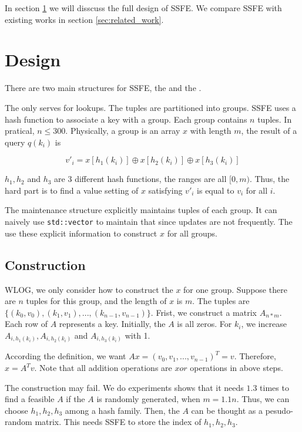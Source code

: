 \documentclass{article}
\begin{document}

In section \ref{sec:design} we will disscuss the full design of SSFE. We compare SSFE with existing works in section \ref{sec:related_work}.

\section{Design}
\label{sec:design}

There are two main structures for SSFE, the \qs and the \ms.

\textbf{\qs} The \qs only serves for lookups. The tuples are partitioned into groups. SSFE uses a hash function to associate a key with a group. Each group contains $n$ tuples. In pratical, $n \le 300$. Physically, a group is an array $x$ with length $m$, the result of a query $q(k_i)$ is

$$v'_i = x[h_1(k_i)] \oplus x[h_2(k_i)] \oplus x[h_3(k_i)]$$

$h_1, h_2$ and $h_3$ are 3 different hash functions, the ranges are all $[0, m)$. Thus, the hard part is to find a value setting of $x$ satisfying $v'_i$ is equal to $v_i$ for all $i$.


\textbf{\ms} The maintenance structure explicitly maintains tuples of each group. It can naively use \texttt{std::vector} to maintain that since updates are not frequently. The \ms use these explicit information to construct $x$ for all groups.


\subsection{Construction}
\label{sec:construction}

WLOG, we only consider how to construct the $x$ for one group. Suppose there are $n$ tuples for this group, and the length of $x$ is $m$. The tuples are $\{(k_0, v_0), (k_1, v_1), ..., (k_{n-1}, v_{n-1})\}$. Frist, we construct a matrix $A_{n*m}$. Each row of $A$ represents a key. Initially, the $A$ is all zeros. For $k_i$, we increase $A_{i,h_1(k_i)}, A_{i,h_2(k_i)}$ and $A_{i,h_3(k_i)}$ with 1.

According the definition, we want $Ax = (v_0, v_1, ..., v_{n-1})^T = v$. Therefore, $x = A^{T}v$. Note that all addition operations are $xor$ operations in above steps.

The construction may fail. We do experiments shows that it needs $1.3$ times to find a feasible $A$ if the $A$ is randomly generated, when $m = 1.1n$. Thus, we can choose $h_1, h_2, h_3$ among a hash family. Then, the $A$ can be thought as a pesudo-random matrix. This needs SSFE to store the index of $h_1, h_2, h_3$.
\end{document}
